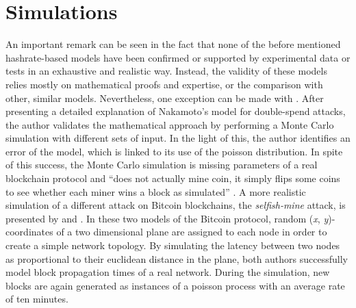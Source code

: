 \documentclass[a4paper,12pt,twoside]{report}
\begin{document}
\section{Simulations}
An important remark can be seen in the fact that none of the before mentioned hashrate-based models have been confirmed or supported by experimental data or tests in an exhaustive and realistic way. Instead, the validity of these models relies mostly on mathematical proofs and expertise, or the comparison with other, similar models. Nevertheless, one exception can be made with \cite{NakamotoExplMCSim}. After presenting a detailed explanation of Nakamoto's model for double-spend attacks, the author validates the mathematical approach by performing a Monte Carlo simulation \cite{montecarlo} with different sets of input. In the light of this, the author identifies an error of the model, which is linked to its use of the poisson distribution. In spite of this success, the Monte Carlo simulation is missing parameters of a real blockchain protocol and ``does not actually mine coin, it simply flips some coins to see whether each miner wins a block as simulated'' \cite{NakamotoExplMCSim}. A more realistic simulation of a different attack on Bitcoin blockchains, the \textit{selfish-mine} attack, is presented by \cite{mwalemodel} and \cite{selfishmine2}. In these two models of the Bitcoin protocol, random (\textit{x}, \textit{y})-coordinates of a two dimensional plane are assigned to each node in order to create a simple network topology. By simulating the latency between two nodes as proportional to their euclidean distance in the plane, both authors successfully model block propagation times of a real network. During the simulation, new blocks are again generated as instances of a poisson process with an average rate of ten minutes. 
\end{document}
